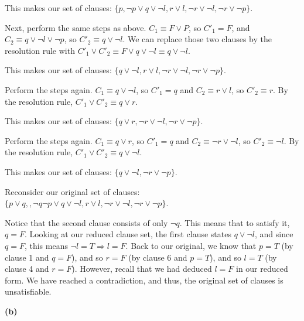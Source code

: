 \documentclass[11pt]{article}
\renewcommand{\part}[1] {\vspace{.10in} {\bf (#1)}}
\begin{document}
This makes our set of clauses: $\{p, \neg p \vee q \vee \neg l, r \vee l, \neg r \vee \neg l, \neg r \vee \neg p\}$.

Next, perform the same steps as above. $C_1 \equiv F \vee P$, so $C'_1 = F$, and $C_2 \equiv q \vee \neg l \vee \neg p$, so $C'_2 \equiv q \vee \neg l$. We can replace those two clauses by the resolution rule with $C'_1 \vee C'_2 \equiv F \vee q \vee \neg l \equiv q \vee \neg l$.

This makes our set of clauses: $\{q \vee \neg l,  r \vee l, \neg r \vee \neg l, \neg r \vee \neg p\}$.

Perform the steps again. $C_1 \equiv q \vee \neg l$, so $C'_1 = q$ and $C_2 \equiv r \vee l$, so $C'_2 \equiv r$. By the resolution rule, $C'_1 \vee C'_2 \equiv q \vee r$.

This makes our set of clauses: $\{q \vee r, \neg r \vee \neg l, \neg r \vee \neg p\}$.

Perform the steps again. $C_1 \equiv q \vee r$, so $C'_1 = q$ and $C_2 \equiv \neg r \vee \neg l$, so $C'_2 \equiv \neg l$. By the resolution rule, $C'_1 \vee C'_2 \equiv q \vee \neg l$.

This makes our set of clauses: $\{q \vee \neg l, \neg r \vee \neg p\}$.

Reconsider our original set of clauses: $\{p \vee q,, \neg q \neg p \vee q \vee \neg l, r \vee l, \neg r \vee \neg l, \neg r \vee \neg p\}$.

Notice that the second clause consists of only $\neg q$. This means that to satisfy it, $q = F$. Looking at our reduced clause set, the first clause states $q \vee \neg l$, and since $q = F$, this means $\neg l = T \Rightarrow l = F$. Back to our original, we know that $p = T$ (by clause 1 and $q = F$), and so $r = F$ (by clause 6 and $p = T$), and so $l = T$ (by clause 4 and $r = F$). However, recall that we had deduced $l = F$ in our reduced form. We have reached a contradiction, and thus, the original set of clauses is unsatisfiable. 

\part{b}
\end{document}
